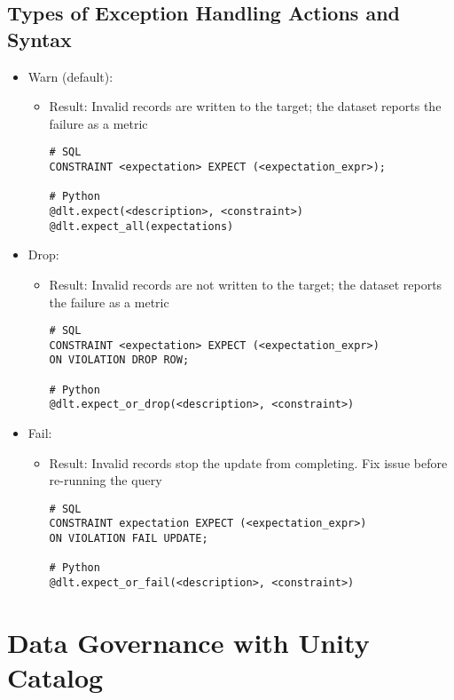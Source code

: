 \documentclass[11pt]{scrartcl}
\begin{document}
\subsection{Types of Exception Handling Actions and Syntax}
\begin{itemize}
	\item Warn (default):
	\begin{itemize}
		\item Result: Invalid records are written to the target; the dataset reports the failure as a metric
\begin{lstlisting}
# SQL
CONSTRAINT <expectation> EXPECT (<expectation_expr>);

# Python
@dlt.expect(<description>, <constraint>)
@dlt.expect_all(expectations)	
\end{lstlisting}
	\end{itemize}
	\item Drop:
	\begin{itemize}
		\item Result: Invalid records are not written to the target; the dataset reports the failure as a metric
\begin{lstlisting}
# SQL
CONSTRAINT <expectation> EXPECT (<expectation_expr>) 
ON VIOLATION DROP ROW;

# Python
@dlt.expect_or_drop(<description>, <constraint>)
\end{lstlisting}
	\end{itemize}
	\item Fail:
	\begin{itemize}
		\item Result: Invalid records stop the update from completing. Fix issue before re-running the query
\begin{lstlisting}
# SQL
CONSTRAINT expectation EXPECT (<expectation_expr>)
ON VIOLATION FAIL UPDATE;

# Python
@dlt.expect_or_fail(<description>, <constraint>)
\end{lstlisting}
	\end{itemize}
\end{itemize}



\section{Data Governance with Unity Catalog} \label{governance}
\end{document}

